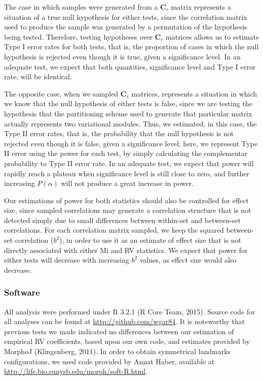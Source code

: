 \documentclass[12pt,]{article}
\begin{document}
The case in which samples were generated from a $\mathbf{C}_r$ matrix
represents a situation of a true null hypothesis for either tests, since
the correlation matrix used to produce the sample was generated by a
permutation of the hypothesis being tested. Therefore, testing
hypotheses over $\mathbf{C}_r$ matrices allows us to estimate Type I
error rates for both tests, that is, the proportion of cases in which
the null hypothesis is rejected even though it is true, given a
significance level. In an adequate test, we expect that both quantities,
significance level and Type I error rate, will be identical.

The opposite case, when we sampled $\mathbf{C}_s$ matrices, represents a
situation in which we know that the null hypothesis of either tests is
false, since we are testing the hypothesis that the partitioning scheme
used to generate that particular matrix actually represents two
variational modules. Thus, we estimated, in this case, the Type II error
rates, that is, the probability that the null hypothesis is not rejected
even though it is false, given a significance level; here, we represent
Type II error using the power for each test, by simply calculating the
complementar probability to Type II error rate. In an adequate test, we
expect that power will rapidly reach a plateau when significance level
is still close to zero, and further increasing $P(\alpha)$ will not
produce a great increase in power.

Our estimations of power for both statistics should also be controlled
for effect size, since sampled correlations may generate a correlation
structure that is not detected simply due to small differences between
within-set and between-set correlations. For each correlation matrix
sampled, we keep the squared between-set correlation ($b^2$), in order
to use it as an estimate of effect size that is not directly associated
with either Mi and RV statistics. We expect that power for either tests
will decrease with increasing $b^2$ values, as effect size would also
decrease.

\subsubsection{Software}\label{software}

All analysis were performed under R 3.2.1 (R Core Team, 2015). Source
code for all analyses can be found at \url{http://github.com/wgar84}. It
is noteworthy that previous tests we made indicated no differences
between our estimation of empirical RV coefficients, based upon our own
code, and estimates provided by MorphoJ (Klingenberg, 2011). In order to
obtain symmetrical landmarks configurations, we used code provided by
Annat Haber, available at
\url{http://life.bio.sunysb.edu/morph/soft-R.html}.
\end{document}
